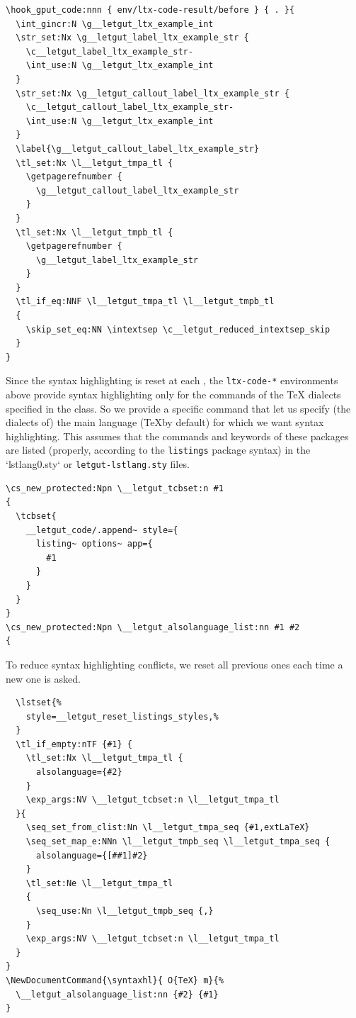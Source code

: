 \documentclass{letgut}
\begin{document}
\begin{lstlisting}
\hook_gput_code:nnn { env/ltx-code-result/before } { . }{
  \int_gincr:N \g__letgut_ltx_example_int
  \str_set:Nx \g__letgut_label_ltx_example_str {
    \c__letgut_label_ltx_example_str-
    \int_use:N \g__letgut_ltx_example_int
  }
  \str_set:Nx \g__letgut_callout_label_ltx_example_str {
    \c__letgut_callout_label_ltx_example_str-
    \int_use:N \g__letgut_ltx_example_int
  }
  \label{\g__letgut_callout_label_ltx_example_str}
  \tl_set:Nx \l__letgut_tmpa_tl {
    \getpagerefnumber {
      \g__letgut_callout_label_ltx_example_str
    }
  }
  \tl_set:Nx \l__letgut_tmpb_tl {
    \getpagerefnumber {
      \g__letgut_label_ltx_example_str
    }
  }
  \tl_if_eq:NNF \l__letgut_tmpa_tl \l__letgut_tmpb_tl
  {
    \skip_set_eq:NN \intextsep \c__letgut_reduced_intextsep_skip
  }
}
\end{lstlisting}

Since the syntax highlighting is reset at each \lstinline++, the \lstinline+ltx-code-*+
environments above provide syntax highlighting only for the commands of the \TeX
dialects specified in the class. So we provide a specific command that let us
specify (the dialects of) the main language (\TeX by default) for which we want
syntax highlighting. This assumes that the commands and keywords of these
packages are listed (properly, according to the \lstinline+listings+ package syntax) in
the `lstlang0.sty` or \lstinline+letgut-lstlang.sty+ files.

\begin{lstlisting}
\cs_new_protected:Npn \__letgut_tcbset:n #1
{
  \tcbset{
    __letgut_code/.append~ style={
      listing~ options~ app={
        #1
      }
    }
  }
}
\cs_new_protected:Npn \__letgut_alsolanguage_list:nn #1 #2
{
\end{lstlisting}
To reduce syntax highlighting conflicts, we reset all previous ones each
time a new one is asked.
\begin{lstlisting}
  \lstset{%
    style=__letgut_reset_listings_styles,%
  }
  \tl_if_empty:nTF {#1} {
    \tl_set:Nx \l__letgut_tmpa_tl {
      alsolanguage={#2}
    }
    \exp_args:NV \__letgut_tcbset:n \l__letgut_tmpa_tl
  }{
    \seq_set_from_clist:Nn \l__letgut_tmpa_seq {#1,extLaTeX}
    \seq_set_map_e:NNn \l__letgut_tmpb_seq \l__letgut_tmpa_seq {
      alsolanguage={[##1]#2}
    }
    \tl_set:Ne \l__letgut_tmpa_tl
    {
      \seq_use:Nn \l__letgut_tmpb_seq {,}
    }
    \exp_args:NV \__letgut_tcbset:n \l__letgut_tmpa_tl
  }
}
\NewDocumentCommand{\syntaxhl}{ O{TeX} m}{%
  \__letgut_alsolanguage_list:nn {#2} {#1}
}
\end{lstlisting}
\end{document}
